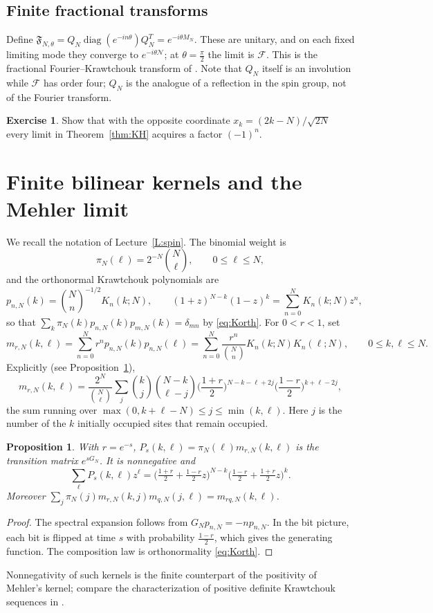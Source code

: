 \documentclass[11pt,reqno]{amsart}
\newtheorem{proposition}[theorem]{Proposition}
\theoremstyle{definition}
\newtheorem{exercise}[theorem]{Exercise}
\theoremstyle{remark}
\newcommand{\F}{\mathcal F}
\newcommand{\NN}{\mathcal N}
\DeclareMathOperator{\diag}{diag}
\begin{document}
\subsection{Finite fractional transforms}
Define $\mathfrak F_{N,\theta}=Q_N\diag(e^{-in\theta})Q_N^T=e^{-i\theta M_N}$.
These are unitary, and on each fixed limiting mode they converge to
$e^{-i\theta\NN}$; at $\theta=\frac\pi2$ the limit is $\F$. This is the
fractional Fourier--Krawtchouk transform of \cite{AtakishievWolf1997}.
Note that $Q_N$ itself is an involution while $\F$ has order four;
$Q_N$ is the analogue of a reflection in the spin group, not of the
Fourier transform.

\begin{exercise}
Show that with the opposite coordinate $x_k=(2k-N)/\sqrt{2N}$ every
limit in Theorem~\ref{thm:KH} acquires a factor $(-1)^n$.
\end{exercise}

\section{Finite bilinear kernels and the Mehler limit}\label{L:kernels}
We recall the notation of Lecture~\ref{L:spin}. The binomial weight is
\[
\pi_N(\ell)=2^{-N}\binom N\ell,\qquad 0\le\ell\le N,
\]
and the orthonormal Krawtchouk polynomials are
\[
p_{n,N}(k)=\binom Nn^{-1/2}K_n(k;N),\qquad
(1+z)^{N-k}(1-z)^k=\sum_{n=0}^NK_n(k;N)z^n,
\]
so that $\sum_k\pi_N(k)p_{n,N}(k)p_{m,N}(k)=\delta_{mn}$ by
\eqref{eq:Korth}. For $0<r<1$, set
\begin{equation}\label{eq:finmehler}
m_{r,N}(k,\ell)=\sum_{n=0}^Nr^np_{n,N}(k)p_{n,N}(\ell)
=\sum_{n=0}^N\frac{r^n}{\binom Nn}K_n(k;N)K_n(\ell;N),
\qquad 0\le k,\ell\le N.
\end{equation}
Explicitly (see Proposition~\ref{prop:finmehler}),
\[
m_{r,N}(k,\ell)=\frac{2^N}{\binom N\ell}\sum_{j}
\binom kj\binom{N-k}{\ell-j}
\Big(\frac{1+r}2\Big)^{N-k-\ell+2j}
\Big(\frac{1-r}2\Big)^{k+\ell-2j},
\]
the sum running over $\max(0,k+\ell-N)\le j\le\min(k,\ell)$. Here $j$ is
the number of the $k$ initially occupied sites that remain occupied.
\begin{proposition}\label{prop:finmehler}
With $r=e^{-s}$, $P_s(k,\ell)=\pi_N(\ell)m_{r,N}(k,\ell)$ is the
transition matrix $e^{sG_N}$. It is nonnegative and
\[
\sum_\ell P_s(k,\ell)z^\ell
=\Big(\tfrac{1+r}2+\tfrac{1-r}2z\Big)^{N-k}
 \Big(\tfrac{1-r}2+\tfrac{1+r}2z\Big)^{k}.
\]
Moreover $\sum_j\pi_N(j)m_{r,N}(k,j)m_{q,N}(j,\ell)=m_{rq,N}(k,\ell)$.
\end{proposition}
\begin{proof}
The spectral expansion follows from $G_Np_{n,N}=-np_{n,N}$. In the bit
picture, each bit is flipped at time $s$ with probability $\frac{1-r}2$,
which gives the generating function. The composition law is
orthonormality \eqref{eq:Korth}.
\end{proof}
Nonnegativity of such kernels is the finite counterpart of the
positivity of Mehler's kernel; compare the characterization of positive
definite Krawtchouk sequences in \cite{Eagleson1969}.
\end{document}
